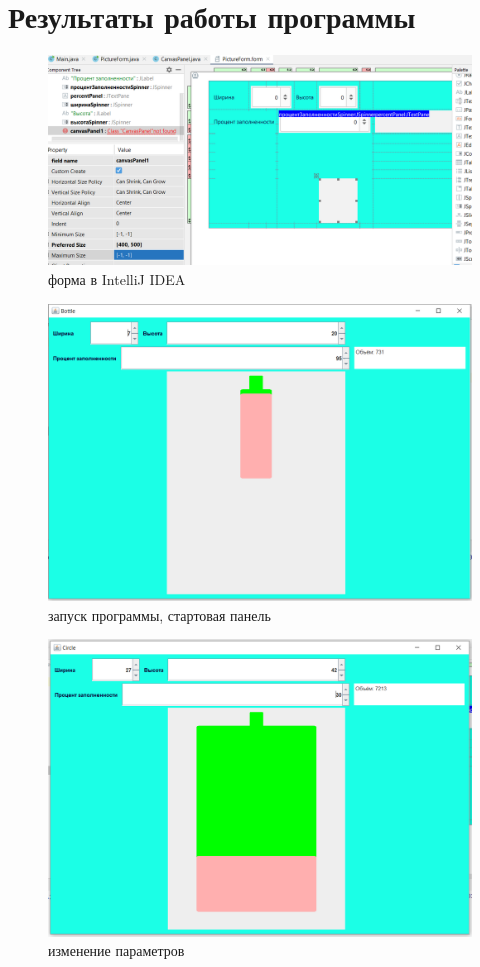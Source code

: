 ﻿\documentclass[a4paper, 12pt]{extarticle}
\begin{document}
\section{Результаты работы программы}
\begin{figure}[H]
    \centering
    \includegraphics[width=400pt]{Test.png}
    \caption{форма в IntelliJ IDEA}
    \label{fig:my_label}
\end{figure}

\begin{figure}[H]
    \centering
    \includegraphics[width=400pt]{Test1.png}
    \caption{запуск программы, стартовая панель}
    \label{fig:my_label}
\end{figure}

\begin{figure}[H]
    \centering
    \includegraphics[width=400pt]{Test2.png}
    \caption{изменение параметров}
    \label{fig:my_label}
\end{figure}
\end{document}
